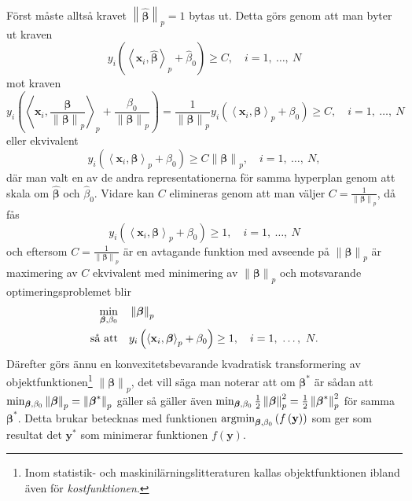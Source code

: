 \documentclass[a4paper, 12pt]{report}
\theoremstyle{definition}
\theoremstyle{remark}
\newcommand{\bfbeta}{{\boldsymbol{\beta}}}
\newcommand{\bfx}{\mathbf{x}}
\newcommand{\bfy}{\mathbf{y}}
\newcommand{\llangle}{\left\langle}
\newcommand{\rrangle}{\right\rangle}
\newcommand{\inner}[2]{\llangle #1, #2 \rrangle}
\begin{document}
Först måste alltså kravet $\left\|\widehat{\bfbeta}
\right\|_p=1$ bytas ut. Detta görs genom att man byter ut kraven
\begin{equation*}
y_i\left(\inner{\bfx_i}{\widehat{\bfbeta}}_p+\widehat{\beta}_0\right)\geq C,\quad i=1,~\dots,~N
\end{equation*}
mot kraven
\begin{equation*}
y_i\left(\inner{\bfx_i}{\frac{\bfbeta}{\left\|\bfbeta
\right\|_p}}_p+\frac{\beta_0}{\left\|\bfbeta
\right\|_p}\right) = 
\frac{1}{\left\|\bfbeta
\right\|_p}y_i\left(\inner{\bfx_i}{\bfbeta}_p+\beta_0\right)
 \geq C,\quad i=1,~\dots,~N
\end{equation*}
eller ekvivalent
\begin{equation*}
y_i\left(\inner{\bfx_i}{\bfbeta}_p+\beta_0\right)\geq C\left\|\bfbeta
\right\|_p,\quad i=1,~\dots,~N,
\end{equation*}
där man valt en av de andra representationerna för samma hyperplan genom att skala om $\widehat{\bfbeta}$ och $\widehat{\beta}_0$. Vidare kan $C$ elimineras genom att man väljer $C=\frac{1}{\left\|\bfbeta
\right\|_p}$, då fås
\begin{equation*}
y_i\left(\inner{\bfx_i}{\bfbeta}_p+\beta_0\right)\geq 1,\quad i=1,~\dots,~N
\end{equation*}
och eftersom $C=\frac{1}{\left\|\bfbeta
\right\|_p}$ är en avtagande funktion med avseende på $\left\|\bfbeta
\right\|_p$ är maximering av $C$ ekvivalent med minimering av $\left\|\bfbeta
\right\|_p$ och motsvarande optimeringsproblemet blir
\begin{equation*}%
\begin{aligned}
\operatornamewithlimits{min}_{\bfbeta, \beta_0} & & &\left\|\bfbeta
\right\|_p\\
\text{så att} & & &y_i\left(\inner{\bfx_i}{\bfbeta}_p+\beta_0\right)\geq 1,\quad i=1,~\dots,~N.
\end{aligned}
\end{equation*}
Därefter görs ännu en konvexitetsbevarande kvadratisk transformering av objektfunktionen\footnote{Inom statistik- och maskinilärningslitteraturen kallas objektfunktionen ibland även för \textit{kostfunktionen}.} $\left\|\bfbeta\right\|_p$, det vill säga man noterar att om $\bfbeta^*$ är sådan att $\operatornamewithlimits{min}_{\bfbeta, \beta_0} \left\|\bfbeta\right\|_p=\left\|\bfbeta^*\right\|_p$ gäller så gäller även $\operatornamewithlimits{min}_{\bfbeta, \beta_0} \frac{1}{2}\left\|\bfbeta\right\|_p^2=\frac{1}{2}\left\|\bfbeta^*\right\|_p^2$ för samma $\bfbeta^*$.
Detta brukar betecknas med funktionen $\operatornamewithlimits{argmin}_{\bfbeta,\beta_0} \left(f\left(\bfy\right)\right)$ som ger som resultat det $\bfy^*$ som minimerar funktionen $f\left(\bfy\right)$.
\end{document}
